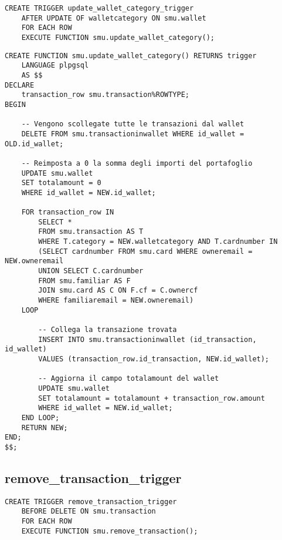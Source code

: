 \begin{lstlisting}[tabsize=2]
    CREATE TRIGGER update_wallet_category_trigger 
    AFTER UPDATE OF walletcategory ON smu.wallet 
    FOR EACH ROW 
    EXECUTE FUNCTION smu.update_wallet_category();
\end{lstlisting}

\begin{lstlisting}[tabsize=2]
    CREATE FUNCTION smu.update_wallet_category() RETURNS trigger
    LANGUAGE plpgsql
    AS $$
DECLARE
    transaction_row smu.transaction%ROWTYPE;
BEGIN

    -- Vengono scollegate tutte le transazioni dal wallet
    DELETE FROM smu.transactioninwallet WHERE id_wallet = OLD.id_wallet;

    -- Reimposta a 0 la somma degli importi del portafoglio
    UPDATE smu.wallet
    SET totalamount = 0
    WHERE id_wallet = NEW.id_wallet;

    FOR transaction_row IN
        SELECT *
        FROM smu.transaction AS T
        WHERE T.category = NEW.walletcategory AND T.cardnumber IN 
        (SELECT cardnumber FROM smu.card WHERE owneremail = NEW.owneremail
        UNION SELECT C.cardnumber
        FROM smu.familiar AS F
        JOIN smu.card AS C ON F.cf = C.ownercf
        WHERE familiaremail = NEW.owneremail)
    LOOP

        -- Collega la transazione trovata
        INSERT INTO smu.transactioninwallet (id_transaction, id_wallet)
        VALUES (transaction_row.id_transaction, NEW.id_wallet);

        -- Aggiorna il campo totalamount del wallet
        UPDATE smu.wallet
        SET totalamount = totalamount + transaction_row.amount
        WHERE id_wallet = NEW.id_wallet;
    END LOOP;
    RETURN NEW;
END;
$$;

\end{lstlisting}

\subsection{remove\_transaction\_trigger}

\begin{lstlisting}[tabsize=2]
    CREATE TRIGGER remove_transaction_trigger 
    BEFORE DELETE ON smu.transaction 
    FOR EACH ROW 
    EXECUTE FUNCTION smu.remove_transaction();
\end{lstlisting}

